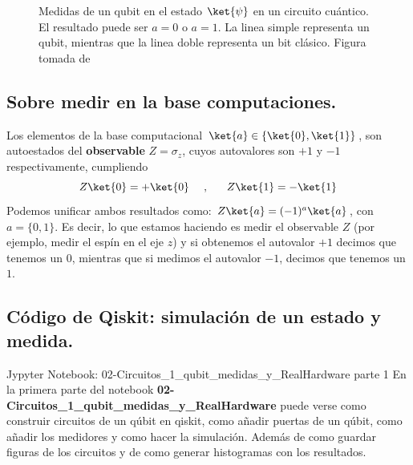 \documentclass[a4paper,11pt]{book} %
\numberwithin{equation}{chapter}
\begin{document}
\begin{figure}[H] \setcounter{subfigure}{0} 
\centering
{}  \hspace{2cm}
\caption{Medidas de un qubit en el estado $\ket{\psi}$ en un circuito cuántico. El resultado puede ser $a = 0$ o $a=1$. La linea simple representa un qubit, mientras que la linea doble representa un bit clásico. Figura tomada de \cite{Curso-JMas}}
\label{Fig_medidas1_cubit_meter}
\end{figure}

		\subsection{Sobre medir en la base computaciones.}

Los elementos de la base computacional $\ket{a}\in \{\ket{0},\ket{1}\}$, son autoestados del \textbf{observable} $Z = \sigma_z $, cuyos autovalores son $+1$ y $-1$ respectivamente, cumpliendo
$$
Z\ket{0} = +\ket{0}~~~~,~~~~~ Z\ket{1} = -\ket{1}
$$ 
Podemos unificar ambos resultados como: $Z\ket{a} = (-1)^a\ket{a}$, con  $a=\{0,1\}$. Es decir, lo que estamos haciendo es medir el observable $Z$ (por ejemplo, medir el espín en el eje $z$) y si obtenemos el autovalor $+1$ decimos que tenemos un 0, mientras que si medimos el autovalor $-1$, decimos que tenemos un $1$. 


		\subsection{Código de Qiskit: simulación de un estado y medida.}  \label{sec_medidas_subsub_codigo}

	\begin{mybox_orange}{Jypyter Notebook: 02-Circuitos\_1\_qubit\_medidas\_y\_RealHardware parte 1}
	En la primera parte del notebook \textbf{02-Circuitos\_1\_qubit\_medidas\_y\_RealHardware} puede verse como construir circuitos de un qúbit en qiskit, 
	como añadir puertas de un qúbit, como añadir los medidores y como hacer la simulación. Además de como guardar figuras de los
	circuitos y de como generar histogramas con los resultados.
	\end{mybox_orange}
	
\end{document}
